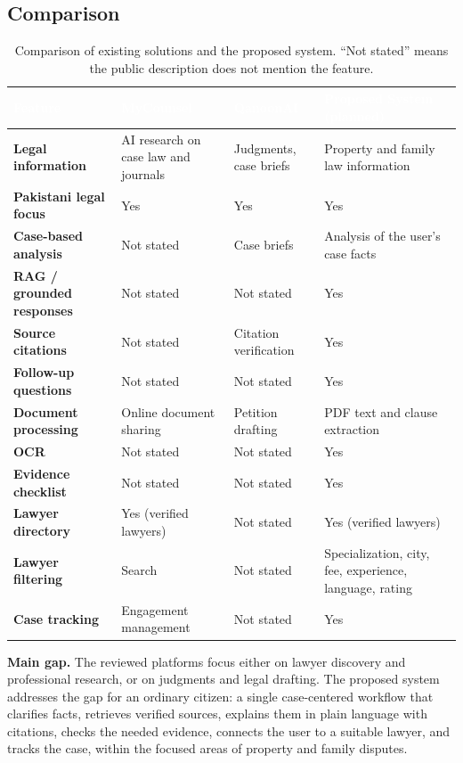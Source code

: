 \documentclass[12pt,a4paper]{report}
\newcommand{\thd}[1]{\textcolor{white}{\textbf{#1}}}
\newcommand{\headrow}{\rowcolor{tablehead}}
\begin{document}
\subsection*{Comparison}
\begin{table}[H]
\centering
\caption{Comparison of existing solutions and the proposed system. ``Not stated'' means the public description does not mention the feature.}
\label{tab:comparison}
\begin{tabular}{|L{3.2cm}|L{3.3cm}|L{3.3cm}|L{3.8cm}|}
\hline
\headrow \thd{Feature} & \thd{MyCounsel} & \thd{QanoonAI} & \thd{Proposed System (planned)} \\ \hline
\textbf{Legal information} & AI research on case law and journals & Judgments, case briefs & Property and family law information \\ \hline
{}\textbf{Pakistani legal focus} & Yes & Yes & Yes \\ \hline
\textbf{Case-based analysis} & Not stated & Case briefs & Analysis of the user's case facts \\ \hline
{}\textbf{RAG / grounded responses} & Not stated & Not stated & Yes \\ \hline
\textbf{Source citations} & Not stated & Citation verification & Yes \\ \hline
{}\textbf{Follow-up questions} & Not stated & Not stated & Yes \\ \hline
\textbf{Document processing} & Online document sharing & Petition drafting & PDF text and clause extraction \\ \hline
{}\textbf{OCR} & Not stated & Not stated & Yes \\ \hline
\textbf{Evidence checklist} & Not stated & Not stated & Yes \\ \hline
{}\textbf{Lawyer directory} & Yes (verified lawyers) & Not stated & Yes (verified lawyers) \\ \hline
\textbf{Lawyer filtering} & Search & Not stated & Specialization, city, fee, experience, language, rating \\ \hline
{}\textbf{Case tracking} & Engagement management & Not stated & Yes \\ \hline
\end{tabular}
\end{table}

\textbf{Main gap.} The reviewed platforms focus either on lawyer discovery and professional research, or on judgments and legal drafting. The proposed system addresses the gap for an ordinary citizen: a single case-centered workflow that clarifies facts, retrieves verified sources, explains them in plain language with citations, checks the needed evidence, connects the user to a suitable lawyer, and tracks the case, within the focused areas of property and family disputes.
\end{document}
